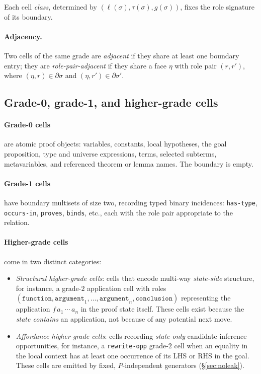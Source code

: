 \documentclass[11pt]{article}
\theoremstyle{definition}
\theoremstyle{plain}
\newcommand{\role}[1]{\texttt{#1}}
\begin{document}
Each cell \emph{class}, determined by $(\ell(\sigma), \tau(\sigma), g(\sigma))$, fixes the role signature of its boundary.

\paragraph{Adjacency.} Two cells of the same grade are \emph{adjacent} if they share at least one boundary entry; they are \emph{role-pair-adjacent} if they share a face $\eta$ with role pair $(r, r')$, where $(\eta, r) \in \partial \sigma$ and $(\eta, r') \in \partial \sigma'$.

\subsection{Grade-0, grade-1, and higher-grade cells}

\paragraph{Grade-0 cells} are atomic proof objects: variables, constants, local hypotheses, the goal proposition, type and universe expressions, terms, selected subterms, metavariables, and referenced theorem or lemma names. The boundary is empty.

\paragraph{Grade-1 cells} have boundary multisets of size two, recording typed binary incidences: \role{has-type}, \role{occurs-in}, \role{proves}, \role{binds}, etc., each with the role pair appropriate to the relation.

\paragraph{Higher-grade cells} come in two distinct categories:
\begin{itemize}
\item \emph{Structural higher-grade cells}: cells that encode multi-way \emph{state-side} structure, for instance, a grade-$2$ application cell with roles $(\role{function}, \role{argument}_1, \ldots, \role{argument}_n, \role{conclusion})$ representing the application $f\,a_1\,\cdots\,a_n$ in the proof state itself. These cells exist because the \emph{state contains} an application, not because of any potential next move.
\item \emph{Affordance higher-grade cells}: cells recording \emph{state-only} candidate inference opportunities, for instance, a \role{rewrite-opp} grade-$2$ cell when an equality in the local context has at least one occurrence of its LHS or RHS in the goal. These cells are emitted by fixed, $P$-independent generators (\S\ref{sec:noleak}).
\end{itemize}
\end{document}
